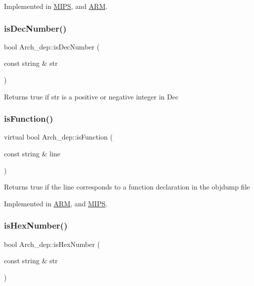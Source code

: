 Implemented in \hyperlink{classMIPS_a1ef435e9100290e46e91863960b64c71}{M\+I\+PS}, and \hyperlink{classARM_a9ef2e856b711bdb39806ebb3d59c4ee3}{A\+RM}.

\mbox{\label{classArch__dep_a674e544699e6ba167f7e29e0ea046ffc}} 
\subsubsection{\texorpdfstring{is\+Dec\+Number()}{isDecNumber()}}
{\footnotesize\ttfamily bool Arch\+\_\+dep\+::is\+Dec\+Number (\begin{DoxyParamCaption}\item[{const string \&}]{str }\end{DoxyParamCaption})}

Returns true if str is a positive or negative integer in Dec \mbox{\label{classArch__dep_ae876048f1f6ac62a6f7cb84067189866}} 
\subsubsection{\texorpdfstring{is\+Function()}{isFunction()}}
{\footnotesize\ttfamily virtual bool Arch\+\_\+dep\+::is\+Function (\begin{DoxyParamCaption}\item[{const string \&}]{line }\end{DoxyParamCaption})\hspace{0.3cm}{\ttfamily [pure virtual]}}

Returns true if the line corresponds to a function declaration in the objdump file 

Implemented in \hyperlink{classARM_a97cd03133ef631d78cc567c8ded65433}{A\+RM}, and \hyperlink{classMIPS_a2de73769c68612b81e2e15b4eaf07969}{M\+I\+PS}.

\mbox{\label{classArch__dep_a7c5d045c231fa0aa3890f49c35614a0a}} 
\subsubsection{\texorpdfstring{is\+Hex\+Number()}{isHexNumber()}}
{\footnotesize\ttfamily bool Arch\+\_\+dep\+::is\+Hex\+Number (\begin{DoxyParamCaption}\item[{const string \&}]{str }\end{DoxyParamCaption})}

